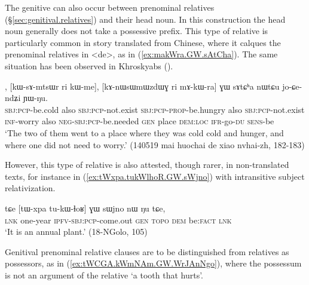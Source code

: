 The genitive can also occur between prenominal relatives (§\ref{sec:genitival.relatives}) and their head noun. In this construction the head noun generally does not take a possessive prefix. This type of relative is particularly common in story translated from Chinese, where it calques the prenominal relatives in  <de>, as in (\ref{ex:makWra.GW.sAtCha}). The same situation has been observed in Khroskyabs (\citealt[640--643]{lai17khroskyabs}).

\begin{exe}
\ex \label{ex:makWra.GW.sAtCha}
\gll [kɯ-ɣɤndʐo ri kɯ-me], [kɯ-sɤ-mtsɯr ri kɯ-me], [kɤ-nɯsɯmɯzdɯɣ ri mɤ-kɯ-ra] ɣɯ sɤtɕʰa nɯtɕu jo-ɕe-ndʑi ɲɯ-ŋu. \\
\textsc{sbj}:\textsc{pcp}-be.cold also \textsc{sbj}:\textsc{pcp}-not.exist \textsc{sbj}:\textsc{pcp}-\textsc{prop}-be.hungry also \textsc{sbj}:\textsc{pcp}-not.exist \textsc{inf}-worry also \textsc{neg}-\textsc{sbj}:\textsc{pcp}-be.needed \textsc{gen} place \textsc{dem}:\textsc{loc} \textsc{ifr}-go-\textsc{du} \textsc{sens}-be \\
\glt  `The two of them went to a place where they was cold cold and hunger, and where one did not need to worry.' (140519 mai huochai de xiao nvhai-zh, 182-183)
\end{exe}

However, this type of relative is also attested, though rarer, in non-translated texts, for instance in (\ref{ex:tWxpa.tukWlhoR.GW.sWjno}) with intransitive subject relativization.
 

\begin{exe}
\ex \label{ex:tWxpa.tukWlhoR.GW.sWjno}
\gll  tɕe [tɯ-xpa tu-kɯ-ɬoʁ] ɣɯ sɯjno nɯ ŋu tɕe, \\
\textsc{lnk} one-year \textsc{ipfv}-\textsc{sbj}:\textsc{pcp}-come.out \textsc{gen}  \textsc{topo} \textsc{dem} be:\textsc{fact} \textsc{lnk} \\
\glt  `It is an annual plant.' (18-NGolo, 105)
\end{exe}

Genitival prenominal relative clauses are to be distinguished from relatives as possessors, as in (\ref{ex:tWCGA.kWmNAm.GW.WrJAnNgo}), where the possessum   is not an argument of the relative  `a tooth that hurts'. 

